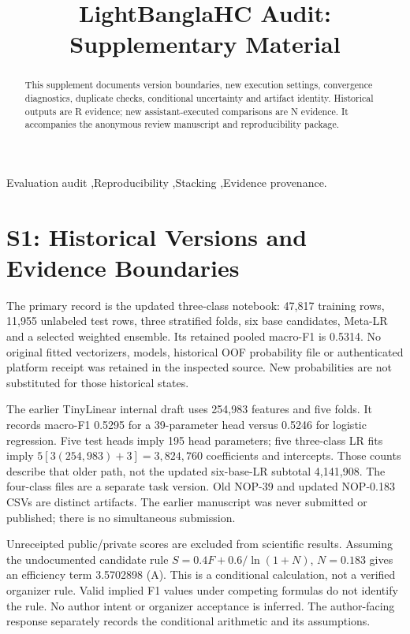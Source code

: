 \documentclass[doublecolumn]{ijcvsplatex}
\begin{document}
\begin{frontmatter}
\title{\LARGE LightBanglaHC Audit: Supplementary Material}
\begin{abstract}
This supplement documents version boundaries, new execution settings, convergence diagnostics, duplicate checks, conditional uncertainty and artifact identity. Historical outputs are R evidence; new assistant-executed comparisons are N evidence. It accompanies the anonymous review manuscript and reproducibility package.
\end{abstract}
\begin{keyword}
Evaluation audit \sep Reproducibility \sep Stacking \sep Evidence provenance.
\end{keyword}
\end{frontmatter}

\section{S1: Historical Versions and Evidence Boundaries}
The primary record is the updated three-class notebook: 47,817 training rows, 11,955 unlabeled test rows, three stratified folds, six base candidates, Meta-LR and a selected weighted ensemble. Its retained pooled macro-F1 is 0.5314. No original fitted vectorizers, models, historical OOF probability file or authenticated platform receipt was retained in the inspected source. New probabilities are not substituted for those historical states.

The earlier TinyLinear internal draft uses 254,983 features and five folds. It records macro-F1 0.5295 for a 39-parameter head versus 0.5246 for logistic regression. Five test heads imply 195 head parameters; five three-class LR fits imply $5[3(254{,}983)+3]=3{,}824{,}760$ coefficients and intercepts. Those counts describe that older path, not the updated six-base-LR subtotal 4,141,908. The four-class files are a separate task version. Old NOP-39 and updated NOP-0.183 CSVs are distinct artifacts. The earlier manuscript was never submitted or published; there is no simultaneous submission.

Unreceipted public/private scores are excluded from scientific results. Assuming the undocumented candidate rule $S=0.4F+0.6/\ln(1+N)$, $N=0.183$ gives an efficiency term 3.5702898 (A). This is a conditional calculation, not a verified organizer rule. Valid implied F1 values under competing formulas do not identify the rule. No author intent or organizer acceptance is inferred. The author-facing response separately records the conditional arithmetic and its assumptions.
\end{document}
